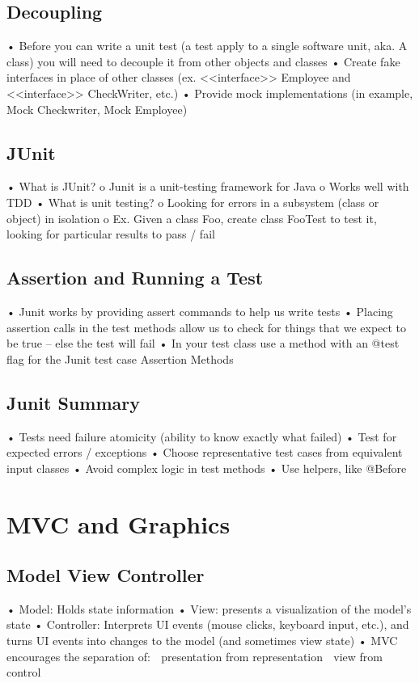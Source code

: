 \documentclass[11pt]{article}
\begin{document}
\subsection{Decoupling}
• Before you can write a unit test (a test apply to a single software unit, aka. A class) you will need to
decouple it from other objects and classes
• Create fake interfaces in place of other classes (ex. <<interface>> Employee and <<interface>>
CheckWriter, etc.)
• Provide mock implementations (in example, Mock Checkwriter, Mock Employee)
\subsection{JUnit}
• What is JUnit?
o Junit is a unit-testing framework for Java
o Works well with TDD
• What is unit testing?
o Looking for errors in a subsystem (class or object) in isolation
o Ex. Given a class Foo, create class FooTest to test it, looking for particular results to
pass / fail
\subsection{Assertion and Running a Test}
• Junit works by providing assert commands to help us write tests
• Placing assertion calls in the test methods allow us to check for things that we expect to be true –
else the test will fail
• In your test class use a method with an @test flag for the Junit test case
Assertion Methods
\subsection{Junit Summary}
• Tests need failure atomicity (ability to know exactly what failed)
• Test for expected errors / exceptions
• Choose representative test cases from equivalent input classes
• Avoid complex logic in test methods
• Use helpers, like @Before
\section{MVC and Graphics}
\subsection{Model View Controller}
• Model: Holds state information
• View: presents a visualization of the model’s state
• Controller: Interprets UI events (mouse clicks, keyboard input, etc.), and turns UI events into
changes to the model (and sometimes view state)
• MVC encourages the separation of:
 presentation from representation
 view from control
\end{document}
